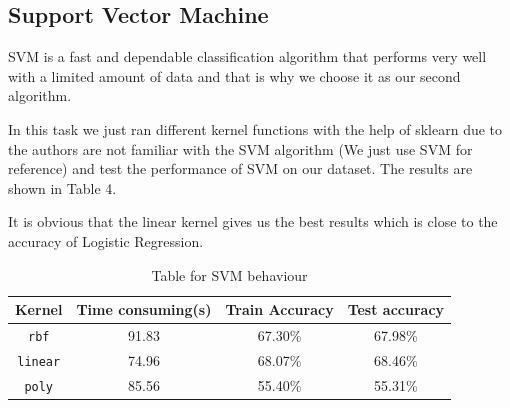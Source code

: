 \documentclass[a4paper,11pt,onecolumn,twoside]{article}
\begin{document}
\subsection{Support Vector Machine}
SVM is a fast and dependable classification algorithm that performs very well with a limited amount of data and that is why we choose it as our second algorithm.\par
In this task we just ran different kernel functions with the help of sklearn  due to the authors are not familiar with the SVM algorithm (We just use SVM for reference) and test the performance of SVM on our dataset. The results are shown in Table 4.\par 
It is obvious that the linear kernel gives us the best results which is close to the accuracy of Logistic Regression.
\begin{table}[htbp]
	\centering
	\begin{tabular}{cccc}
		\midrule[1.5pt]
	\textbf{Kernel} &\textbf{Time consuming}(s)  &\textbf{Train Accuracy}&\textbf{Test accuracy}\\
		\hline
		\texttt{rbf}&91.83&67.30\%&67.98\%\\
		\texttt{linear}&74.96&68.07\%&68.46\%\\
		\texttt{poly}&85.56&55.40\%&55.31\%\\
		\midrule[1.5pt]
	\end{tabular}
	\caption{Table for SVM behaviour}
\end{table}
\end{document}
